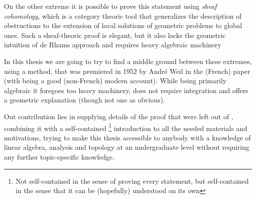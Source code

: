 On the other extreme it is possible to prove this statement using \textit{sheaf cohomology}, which is a category theoric tool
that generalizes the description of obstructions to the extension of local solutions of geometric problems to global ones.
Such a sheaf-theoric proof is elegant, but it also lacks the geometric intuition of de Rhams approach and requires heavy
algebraic machinery

In this thesis we are going to try to find a middle ground between these extremes, using a method, that was premiered in 1952
by André Weil in the (French) paper \cite{weil_sur_1952}
(with \cite{tu_differential_1982} being a good (non-French) modern account). While being primarily algebraic it foregoes too
heavy machinery, does not require integration and offers a geometric explanation (though not one as obvious).

Out contribution lies in supplying details of the proof that were left out of \cite{tu_differential_1982}, combining
it with a self-contained
\footnote{
	Not self-contained in the sense of proving every statement, but self-contained in the sense that it can be
	(hopefully) understood on its own
}
introduction to all the needed materials and motivations, trying to make this thesis accessible to anybody with a
knowledge of linear algebra, analysis and topology at an undergraduate level without requiring any further topic-specific
knowledge.
 
